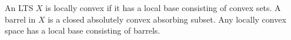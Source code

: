 An LTS $X$ is locally convex if it has a local base consisting of convex sets. A barrel in $X$ is a closed absolutely convex absorbing subset. Any locally convex space has a local base consisting of barrels.